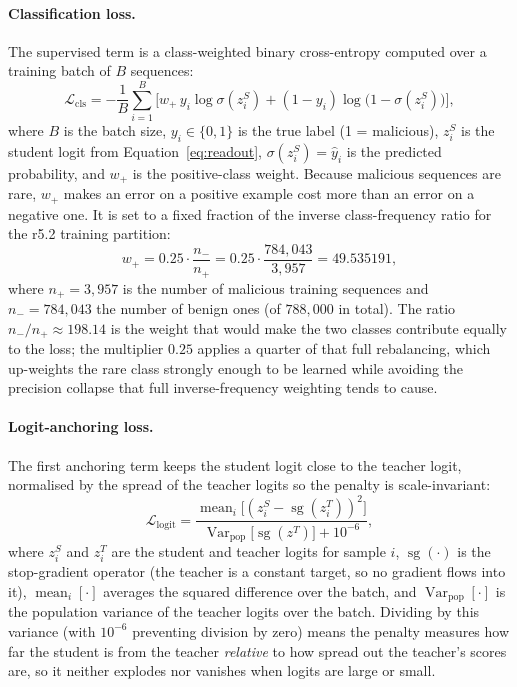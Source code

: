 \paragraph{Classification loss.}
The supervised term is a class-weighted binary cross-entropy computed over a
training batch of \(B\) sequences:
\begin{equation}
\mathcal L_{\mathrm{cls}}
=
-\frac{1}{B}\sum_{i=1}^{B}
\Big[
w_{+}\,y_i\log\sigma(z_i^{S})
+(1-y_i)\log\!\big(1-\sigma(z_i^{S})\big)
\Big],
\label{eq:wbce}
\end{equation}
where \(B\) is the batch size, \(y_i\in\{0,1\}\) is the true label (1 =
malicious), \(z_i^{S}\) is the student logit from
Equation~\eqref{eq:readout}, \(\sigma(z_i^{S})=\hat y_i\) is the predicted
probability, and \(w_{+}\) is the positive-class weight. Because malicious
sequences are rare, \(w_{+}\) makes an error on a positive example cost more
than an error on a negative one. It is set to a fixed fraction of the inverse class-frequency ratio for the r5.2 training partition:
\begin{equation}
w_{+}
=
0.25\cdot\frac{n_{-}}{n_{+}}
=
0.25\cdot\frac{784{,}043}{3{,}957}
=
49.535191,
\label{eq:posweight}
\end{equation}
where \(n_{+}=3{,}957\) is the number of malicious training sequences and
\(n_{-}=784{,}043\) the number of benign ones (of \(788{,}000\) in total).
The ratio \(n_{-}/n_{+}\approx198.14\) is the weight that would make the two
classes contribute equally to the loss; the multiplier \(0.25\) applies a
quarter of that full rebalancing, which up-weights the rare class strongly
enough to be learned while avoiding the precision collapse that full
inverse-frequency weighting tends to cause.
\paragraph{Logit-anchoring loss.}
The first anchoring term keeps the student logit close to the teacher logit,
normalised by the spread of the teacher logits so the penalty is
scale-invariant:
\begin{equation}
\mathcal L_{\mathrm{logit}}
=
\frac{\operatorname{mean}_i\big[(z_i^{S}-\operatorname{sg}(z_i^{T}))^{2}\big]}
{\operatorname{Var}_{\mathrm{pop}}\!\big[\operatorname{sg}(z^{T})\big]+10^{-6}},
\label{eq:logit_anchor}
\end{equation}
where \(z_i^{S}\) and \(z_i^{T}\) are the student and teacher logits for
sample \(i\), \(\operatorname{sg}(\cdot)\) is the stop-gradient operator
(the teacher is a constant target, so no gradient flows into it),
\(\operatorname{mean}_i[\cdot]\) averages the squared difference over the
batch, and \(\operatorname{Var}_{\mathrm{pop}}[\cdot]\) is the population
variance of the teacher logits over the batch. Dividing by this variance
(with \(10^{-6}\) preventing division by zero) means the penalty measures
how far the student is from the teacher \emph{relative} to how spread out
the teacher's scores are, so it neither explodes nor vanishes when logits
are large or small.
